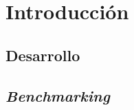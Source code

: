 \pagestyle{fancy}
\fancyhead[LO]{\autorR}
\fancyhead[LE]{\autorA}
\fancyhead[RE,RO]{\textit{\rightmark}}
\fancyfoot[L]{\asignaturaAbbr}
\fancyfoot[R]{\fecha}

\section{Introducción}

\subsection{Desarrollo}

\subsection{\textit{Benchmarking}}
